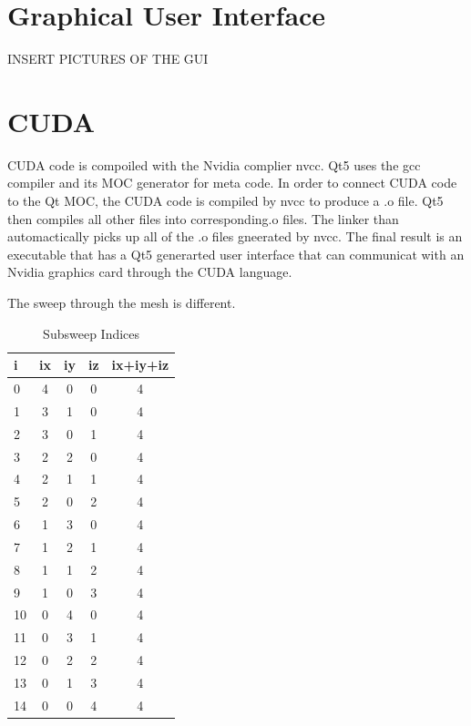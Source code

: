 \section{Graphical User Interface}\label{sec:gui}

INSERT PICTURES OF THE GUI

\section{CUDA}\label{sec:cuda}
CUDA code is compoiled with the Nvidia complier nvcc. Qt5 uses the gcc compiler and its MOC generator for meta code. In order to connect CUDA code to the Qt MOC, the CUDA code is compiled by nvcc to produce a .o file. Qt5 then compiles all other files into corresponding.o files. The linker than automactically picks up all of the .o files gneerated by nvcc. The final result is an executable that has a Qt5 generarted user interface that can communicat with an Nvidia graphics card through the CUDA language.

The sweep through the mesh is different.

\begin{table}[ht]
\caption{Subsweep Indices}
\centering 
\begin{tabular}{l | c | c | c | c}
  \hline \hline   
  i  & ix & iy & iz & ix+iy+iz \\ [0.5ex] %
  \hline
  0  & 4 & 0 & 0 & 4\\
  1  & 3 & 1 & 0 & 4\\
  2  & 3 & 0 & 1 & 4\\
  3  & 2 & 2 & 0 & 4\\
  4  & 2 & 1 & 1 & 4\\
  5  & 2 & 0 & 2 & 4\\
  6  & 1 & 3 & 0 & 4\\
  7  & 1 & 2 & 1 & 4\\
  8  & 1 & 1 & 2 & 4\\
  9  & 1 & 0 & 3 & 4\\
  10 & 0 & 4 & 0 & 4\\
  11 & 0 & 3 & 1 & 4\\
  12 & 0 & 2 & 2 & 4\\
  13 & 0 & 1 & 3 & 4\\
  14 & 0 & 0 & 4 & 4\\ [1ex]      %
  \hline
\end{tabular}
\label{table:subsweep}
\end{table}

